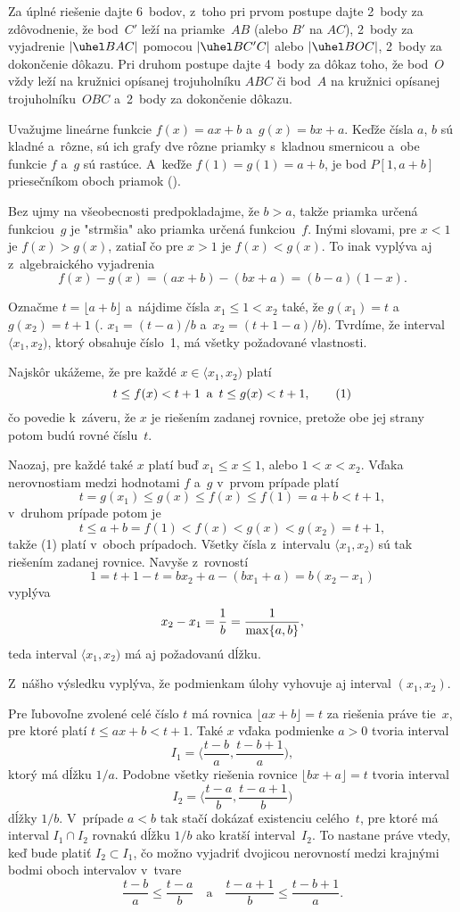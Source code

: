 {\nobreak\medskip\petit\noindent
Za úplné riešenie dajte 6~bodov, z~toho pri prvom postupe dajte
2~body za zdôvodnenie, že bod~$C'$ leží na priamke~$AB$ (alebo $B'$ na $AC$),
2~body za vyjadrenie $|\uhel BAC|$ pomocou $|\uhel BC'C|$ alebo $|\uhel BOC|$,
2~body za dokončenie dôkazu.
Pri druhom postupe dajte
4~body za dôkaz toho, že bod~$O$ vždy leží na
kružnici opísanej trojuholníku $ABC$ či bod~$A$ na
kružnici opísanej trojuholníku~$OBC$
a~2~body za dokončenie dôkazu.

\endpetit
\bigbreak}

{%
Uvažujme lineárne funkcie $f(x)=ax+b$ a~$g(x)=bx+a$. Keďže čísla $a$, $b$ sú
kladné a~rôzne, sú ich grafy dve rôzne priamky s~kladnou smernicou a~obe funkcie
$f$ a~$g$ sú rastúce. A~keďže $f(1)=g(1)=a+b$, je bod $P[1,a+b]$
priesečníkom oboch priamok (\obr).
%

Bez ujmy na všeobecnosti predpokladajme, že $b>a$, takže
priamka určená funkciou~$g$ je "strmšia" ako priamka určená funkciou~$f$.
Inými slovami, pre $x<1$ je $f(x)>g(x)$, zatiaľ čo pre $x>1$ je $f(x)<g(x)$.
To inak vyplýva aj z~algebraického vyjadrenia
$$
f(x)-g(x)=(ax+b)-(bx+a)=(b-a)(1-x).
$$

Označme $t=\lfloor a+b \rfloor$ a~nájdime čísla $x_1\le 1< x_2$
také, že $g(x_1)=t$ a~$g(x_2)=t+1$ (\tj. $x_1=(t-a)/b$
a~$x_2=(t+1-a)/b$). Tvrdíme, že interval $\langle x_1,x_2)$,
ktorý obsahuje číslo~1, má všetky požadované vlastnosti.

Najskôr ukážeme, že pre každé $x\in\langle x_1,x_2)$ platí
$$
t\le f(x)<t+1\quad\text{a}\quad t\le g(x)<t+1,
\tag1
$$
čo povedie k~záveru, že $x$ je riešením zadanej rovnice,
pretože obe jej strany potom budú rovné číslu~$t$.

Naozaj, pre každé také $x$
platí buď $x_1\le x\le 1$, alebo $1<x<x_2$. Vďaka nerovnostiam
medzi hodnotami $f$ a~$g$ v~prvom prípade platí
$$
t=g(x_1)\le g(x)\le f(x)\le f(1)=a+b<t+1,
$$
v~druhom prípade potom je
$$
t\le a+b=f(1)<f(x)<g(x)<g(x_2)=t+1,
$$
takže (1) platí v~oboch prípadoch. Všetky čísla
z~intervalu $\langle x_1,x_2)$ sú tak riešením zadanej rovnice.
Navyše z~rovností
$$
1=t+1-t = bx_2+a-(bx_1+a)=b(x_2-x_1)
$$
vyplýva
$$
\postdisplaypenalty 10000
x_2-x_1=\frac1b= \frac1{\max\{a,b\}},
$$
teda interval $\langle x_1,x_2)$ má aj požadovanú dĺžku.

Z~nášho výsledku vyplýva, že podmienkam úlohy vyhovuje aj interval
$(x_1,x_2)$.

\ineres
Pre ľubovoľne zvolené celé číslo $t$ má rovnica $\lfloor ax+b\rfloor=t$
za riešenia práve tie~$x$, pre ktoré platí $t\le ax+b<t+1$. Také
$x$ vďaka podmienke $a>0$ tvoria interval
$$
I_1=\Big\langle\frac{t-b}{a},\frac{t-b+1}{a}\Big),
$$
ktorý má dĺžku $1/a$. Podobne všetky riešenia rovnice
$\lfloor bx+a\rfloor=t$ tvoria interval
$$
I_2=\Big\langle\frac{t-a}{b},\frac{t-a+1}{b}\Big)
$$
dĺžky $1/b$. V~prípade $a<b$ tak stačí dokázať
existenciu celého~$t$, pre ktoré má interval $I_1\cap I_2$ rovnakú dĺžku
$1/b$ ako kratší interval~$I_2$. To nastane práve
vtedy, keď bude platiť $I_2\subset I_1$, čo možno vyjadriť dvojicou
nerovností medzi krajnými bodmi oboch intervalov v~tvare
$$
\frac{t-b}{a}\le\frac{t-a}{b}\quad\text{a}\quad
\frac{t-a+1}{b}\le\frac{t-b+1}{a}.
$$

}
